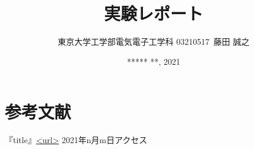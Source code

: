\documentclass{ltjsarticle}
\title{実験レポート}
\author{東京大学工学部電気電子工学科 03210517\ 藤田 誠之 }
\date{ ***** **, 2021}
\begin{document}
\maketitle

\section{参考文献}
『title』\url{<url>} 2021年n月m日アクセス
\end{document}
